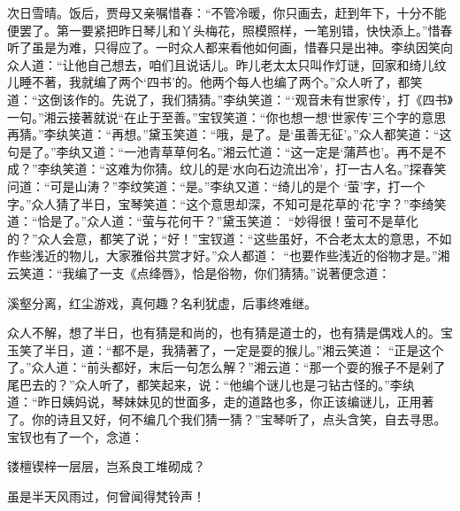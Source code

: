 \begin{parag}
    次日雪晴。饭后，贾母又亲嘱惜春：“不管冷暖，你只画去，赶到年下，十分不能便罢了。第一要紧把昨日琴儿和丫头梅花，照模照样，一笔别错，快快添上。”惜春听了虽是为难，只得应了。一时众人都来看他如何画，惜春只是出神。李纨因笑向众人道：“让他自己想去，咱们且说话儿。昨儿老太太只叫作灯谜，回家和绮儿纹儿睡不著，我就编了两个‘四书’的。他两个每人也编了两个。”众人听了，都笑道：“这倒该作的。先说了，我们猜猜。”李纨笑道：“‘观音未有世家传’，打《四书》一句。”湘云接著就说“在止于至善。”宝钗笑道：“你也想一想‘世家传’三个字的意思再猜。”李纨笑道：“再想。”黛玉笑道：“哦，是了。是‘虽善无征’。”众人都笑道：“这句是了。”李纨又道：“一池青草草何名。”湘云忙道：“这一定是‘蒲芦也’。再不是不成？”李纨笑道：“这难为你猜。纹儿的是‘水向石边流出冷’，打一古人名。”探春笑问道：“可是山涛？”李纹笑道：“是。”李纨又道：“绮儿的是个 ‘萤’字，打一个字。”众人猜了半日，宝琴笑道：“这个意思却深，不知可是花草的‘花’字？”李绮笑道：“恰是了。”众人道：“萤与花何干？”黛玉笑道： “妙得很！萤可不是草化的？”众人会意，都笑了说；“好！”宝钗道：“这些虽好，不合老太太的意思，不如作些浅近的物儿，大家雅俗共赏才好。”众人都道： “也要作些浅近的俗物才是。”湘云笑道：“我编了一支《点绛唇》，恰是俗物，你们猜猜。”说著便念道：
\end{parag}


\begin{poem}
    \begin{pl}溪壑分离，红尘游戏，真何趣？名利犹虚，后事终难继。\end{pl}
\end{poem}


\begin{parag}
    众人不解，想了半日，也有猜是和尚的，也有猜是道士的，也有猜是偶戏人的。宝玉笑了半日，道：“都不是，我猜著了，一定是耍的猴儿。”湘云笑道： “正是这个了。”众人道：“前头都好，末后一句怎么解？”湘云道：“那一个耍的猴子不是剁了尾巴去的？”众人听了，都笑起来，说：“他编个谜儿也是刁钻古怪的。”李纨道：“昨日姨妈说，琴妹妹见的世面多，走的道路也多，你正该编谜儿，正用著了。你的诗且又好，何不编几个我们猜一猜？”宝琴听了，点头含笑，自去寻思。宝钗也有了一个，念道：
\end{parag}


\begin{poem}
    \begin{pl}镂檀锲梓一层层，岂系良工堆砌成？\end{pl}

    \begin{pl}虽是半天风雨过，何曾闻得梵铃声！\end{pl}

\end{poem}


